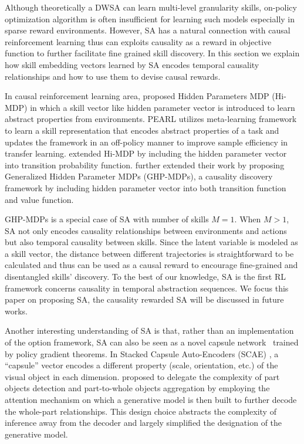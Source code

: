 Although theoretically a DWSA can learn multi-level granularity
skills, on-policy optimization algorithm is often insufficient
for learning such models especially in sparse reward
environments. However, SA has a natural connection with causal
reinforcement learning thus can exploits causality as a reward in
objective function to further facilitate fine grained skill
discovery. In this section we explain how skill embedding vectors
learned by SA encodes temporal causality relationships and how to
use them to devise causal rewards.

In causal reinforcement learning area, 
proposed Hidden Parameters MDP (Hi-MDP) in which a skill vector
like hidden parameter vector is introduced to learn abstract
properties from environments. PEARL \cite{rakelly2019efficient}
utilizes meta-learning framework to learn a skill representation
that encodes abstract properties of a task and updates the
framework in an off-policy manner to improve sample efficiency in
transfer learning.  extended Hi-MDP
by including the hidden parameter vector into transition
probability function.  further
extended their work by proposing Generalized Hidden Parameter
MDPs (GHP-MDPs), a causality discovery framework by including
hidden parameter vector into both transition function and value
function.

GHP-MDPs is a special case of SA with number of skills $M=1$.
When $M>1$, SA not only encodes causality relationships between
environments and actions but also temporal causality between
skills. Since the latent variable is modeled as a skill vector,
the distance between different trajectories is straightforward to
be calculated and thus can be used as a causal reward to
encourage fine-grained and disentangled skills' discovery. To the
best of our knowledge, SA is the first RL framework concerns
causality in temporal abstraction sequences. We focus this paper
on proposing SA, the causality rewarded SA will be discussed in
future works.

Another interesting understanding of SA is that, rather than an
implementation of the option framework, SA can also be seen as a
novel capsule network~ trained by
policy gradient theorems. In Stacked Capsule Auto-Encoders (SCAE)
\cite{kosiorek2019stacked}, a ``capsule'' vector encodes a
different property (scale, orientation, etc.) of the visual
object in each dimension.  proposed
to delegate the complexity of part objects detection and
part-to-whole objects aggregation by employing the attention
mechanism \cite{lee2019set} on which a generative model is then
built to further decode the whole-part relationships. This design
choice abstracts the complexity of inference away from the
decoder and largely simplified the designation of the generative
model.

